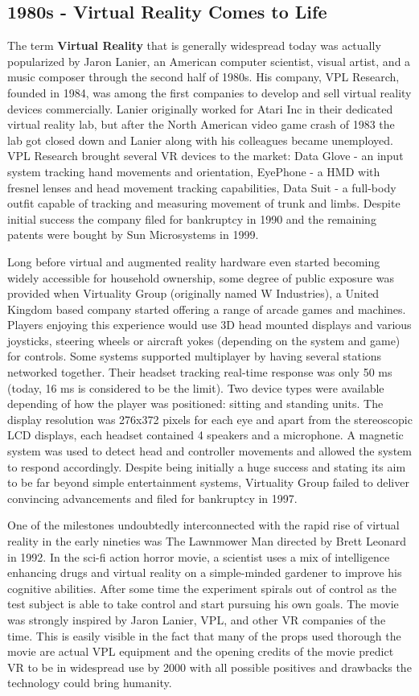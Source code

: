 \documentclass[12pt, a4paper]{article}
\begin{document}
\subsection{1980s - Virtual Reality Comes to Life}
The term \textbf{Virtual Reality} that is generally widespread today was actually popularized by Jaron Lanier, an American computer scientist, visual artist, and a music composer through the second half of 1980s. His company, VPL Research, founded in 1984, was among the first companies to develop and sell virtual reality devices commercially. Lanier originally worked for Atari Inc in their dedicated virtual reality lab, but after the North American video game crash of 1983 the lab got closed down and Lanier along with his colleagues became unemployed. VPL Research brought several VR devices to the market: Data Glove - an input system tracking hand movements and orientation, EyePhone - a HMD with fresnel lenses and head movement tracking capabilities, Data Suit - a full-body outfit capable of tracking and measuring movement of trunk and limbs. Despite initial success the company filed for bankruptcy in 1990 and the remaining patents were bought by Sun Microsystems in 1999.

Long before virtual and augmented reality hardware even started becoming widely accessible for household ownership, some degree of public exposure was provided when Virtuality Group (originally named W Industries), a United Kingdom based company started offering a range of arcade games and machines. Players enjoying this experience would use 3D head mounted displays and various joysticks, steering wheels or aircraft yokes (depending on the system and game) for controls. Some systems supported multiplayer by having several stations networked together. Their headset tracking real-time response was only 50 ms (today, 16 ms is considered to be the limit). Two device types were available depending of how the player was positioned: sitting and standing units. The display resolution was 276x372 pixels for each eye and apart from the stereoscopic LCD displays, each headset contained 4 speakers and a microphone. A magnetic system was used to detect head and controller movements and allowed the system to respond accordingly. Despite being initially a huge success and stating its aim to be far beyond simple entertainment systems, Virtuality Group failed to deliver convincing advancements and filed for bankruptcy in 1997.

One of the milestones undoubtedly interconnected with the rapid rise of virtual reality in the early nineties was The Lawnmower Man directed by Brett Leonard in 1992. In the sci-fi action horror movie, a scientist uses a mix of intelligence enhancing drugs and virtual reality on a simple-minded gardener to improve his cognitive abilities. After some time the experiment spirals out of control as the test subject is able to take control and start pursuing his own goals. The movie was strongly inspired by Jaron Lanier, VPL, and other VR companies of the time. This is easily visible in the fact that many of the props used thorough the movie are actual VPL equipment and the opening credits of the movie predict VR to be in widespread use by 2000 with all possible positives and drawbacks the technology could bring humanity.
\end{document}
